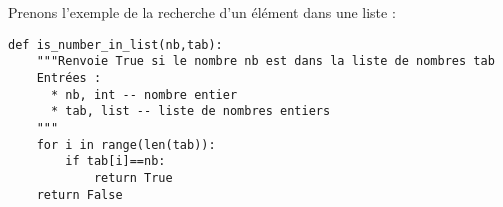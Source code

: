 Prenons l'exemple de la recherche d'un élément dans une liste : 


\noindent
\begin{minipage}[c]{.49\linewidth}
%

\begin{lstlisting}
def is_number_in_list(nb,tab):
    """Renvoie True si le nombre nb est dans la liste de nombres tab
    Entrées :
      * nb, int -- nombre entier
      * tab, list -- liste de nombres entiers    
    """
    for i in range(len(tab)):
        if tab[i]==nb:
            return True
    return False
\end{lstlisting}



\end{minipage}
